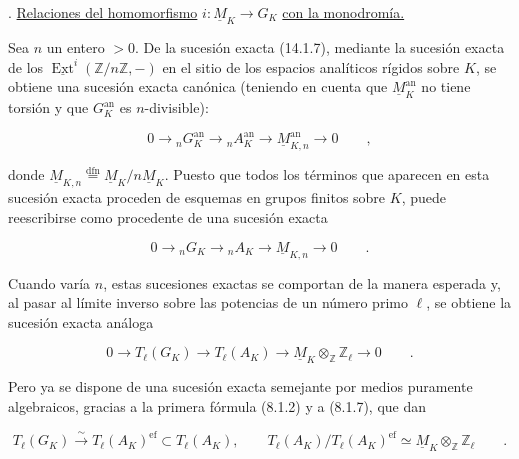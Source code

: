 \par\medskip
{}. \underline{Relaciones del homomorfismo}
$i:\underline M_K\longrightarrow G_K$ \underline{con la monodromía.}

Sea $n$ un entero $>0$. De la sucesión exacta (14.1.7), mediante la
sucesión exacta de los
$\underline{\operatorname{Ext}}^i(\mathbb Z/n\mathbb Z,-)$ en el
sitio de los espacios analíticos rígidos sobre $K$, se obtiene una
sucesión exacta canónica (teniendo en cuenta que
$\underline M_K^{\mathrm{an}}$ no tiene torsión y que
$G_K^{\mathrm{an}}$ es $n$-divisible):

\begin{equation*}
 0\longrightarrow{}_nG_K^{\mathrm{an}}
 \longrightarrow{}_nA_K^{\mathrm{an}}
 \longrightarrow\underline M_{K,n}^{\mathrm{an}}
 \longrightarrow0\qquad ,
\end{equation*}

\noindent
donde
$\underline M_{K,n}\overset{\mathrm{dfn}}{=}
\underline M_K/n\underline M_K$. Puesto que todos los términos que
aparecen en esta sucesión exacta proceden de esquemas en grupos finitos
sobre $K$, puede reescribirse como procedente de una sucesión exacta

\begin{equation}\tag{14.2.1}
 0\longrightarrow{}_nG_K\longrightarrow{}_nA_K
 \longrightarrow\underline M_{K,n}\longrightarrow0\qquad .
\end{equation}

\noindent
Cuando varía $n$, estas sucesiones exactas se comportan de la manera
esperada y, al pasar al límite inverso sobre las potencias de un número
primo $\ell$, se obtiene la sucesión exacta análoga

\begin{equation}\tag{14.2.2}
 0\longrightarrow T_\ell(G_K)\longrightarrow T_\ell(A_K)
 \longrightarrow\underline M_K\otimes_{\mathbb Z}\mathbb Z_\ell
 \longrightarrow0\qquad .
\end{equation}

\noindent
Pero ya se dispone de una sucesión exacta semejante por medios puramente
algebraicos, gracias a la primera fórmula (8.1.2) y a (8.1.7), que dan

\begin{equation}\tag{14.2.3}
 T_\ell(G_K)\xrightarrow{\ \sim\ }T_\ell(A_K)^{\mathrm{ef}}
 \subset T_\ell(A_K),\qquad
 T_\ell(A_K)/T_\ell(A_K)^{\mathrm{ef}}
 \simeq\underline M_K\otimes_{\mathbb Z}\mathbb Z_\ell\qquad .
\end{equation}

